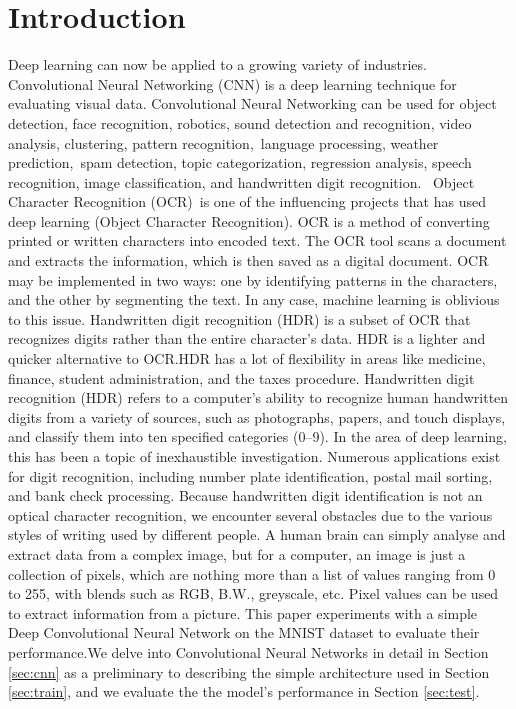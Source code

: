 \documentclass[conference]{IEEEtran}
\begin{document}
\section{Introduction}
Deep learning can now be applied to a growing variety of industries. Convolutional Neural Networking (CNN) is a deep learning technique for evaluating visual data. Convolutional Neural Networking can be used for object detection, face recognition, robotics, sound detection and recognition, video analysis, clustering, pattern recognition, language processing, weather prediction, spam detection, topic categorization, regression analysis, speech recognition, image classification, and handwritten digit recognition.
 Object Character Recognition (OCR) is one of the influencing projects that has used deep learning (Object Character Recognition). OCR is a method of converting printed or written characters into encoded text. The OCR tool scans a document and extracts the information, which is then saved as a digital document. OCR may be implemented in two ways: one by identifying patterns in the characters, and the other by segmenting the text. In any case, machine learning is oblivious to this issue. Handwritten digit recognition (HDR) is a subset of OCR that recognizes digits rather than the entire character's data. HDR is a lighter and quicker alternative to OCR.\@ HDR has a lot of flexibility in areas like medicine, finance, student administration, and the taxes procedure.
Handwritten digit recognition (HDR) refers to a computer's ability to recognize human handwritten digits from a variety of sources, such as photographs, papers, and touch displays, and classify them into ten specified categories (0--9). In the area of deep learning, this has been a topic of inexhaustible investigation. Numerous applications exist for digit recognition, including number plate identification, postal mail sorting, and bank check processing. Because handwritten digit identification is not an optical character recognition, we encounter several obstacles due to the various styles of writing used by different people. A human brain can simply analyse and extract data from a complex image, but for a computer, an image is just a collection of pixels, which are nothing more than a list of values ranging from 0 to 255, with blends such as RGB, B.W., greyscale, etc. Pixel values can be used to extract information from a picture.
This paper experiments with a simple Deep Convolutional Neural Network on the MNIST\cite{6296535} dataset to evaluate their performance.\@ We delve into Convolutional Neural Networks in detail in Section \ref{sec:cnn} as a preliminary to describing the simple architecture used in Section \ref{sec:train}, and we evaluate the the model's performance in Section \ref{sec:test}.
\end{document}
